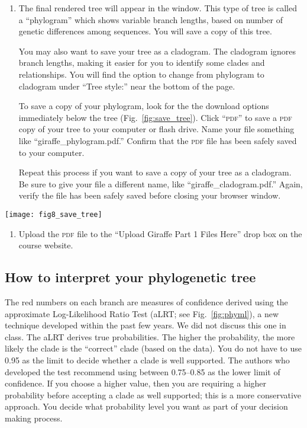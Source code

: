 \documentclass[11pt, addpoints]{exam}
\begin{document}
\begin{enumerate}
\item
  The final rendered tree will appear in the window. This type of tree is called
  a “phylogram” which shows variable branch lengths, based on number of 
  genetic differences among sequences. You will save a copy of this tree.
  
  You may also want to save your tree as a cladogram. The cladogram ignores
  branch lengths, making it easier for you to identify some clades and relationships.
  You will find the option to change from phylogram to cladogram under “Tree style:”
  near the bottom of the page.
  
  To save a copy of your phylogram, look for the the download options immediately 
  below the tree (Fig.~\ref{fig:save_tree}). Click “\textsc{pdf}” to
  save a \textsc{pdf} copy of your tree to your computer or flash drive. Name your file something
  like “giraffe\_phylogram.pdf.” Confirm that the \textsc{pdf} file has been safely saved to your 
  computer.
  
  Repeat this process if you want to save a copy of your tree as a cladogram. Be sure to
  give your file a different name, like “giraffe\_cladogram.pdf.” Again, verify the file has
  been safely saved before closing your browser window.
  
\end{enumerate}

\begin{center}
	\texttt{[image: fig8\_save\_tree]}
\end{center}

\begin{enumerate}
\item
  Upload the \textsc{pdf} file to the ``Upload Giraffe Part 1 Files Here'' drop
  box on the course website.
\end{enumerate}

\subsection*{How to interpret your phylogenetic tree}

The red numbers on each branch are measures of confidence derived using
the approximate Log-Likelihood Ratio Test (aLRT; see Fig.~\ref{fig:phyml}), a new
technique developed within the past few years. We did not discuss this
one in class. The aLRT derives true probabilities. The higher the
probability, the more likely the clade is the “correct” clade (based
on the data). You do not have to use 0.95 as the limit to decide whether
a clade is well supported. The authors who developed the test recommend
using between 0.75--0.85 as the lower limit of confidence. If you choose
a higher value, then you are requiring a higher probability before
accepting a clade as well supported; this is a more conservative
approach. You decide what probability level you want as part of your
decision making process.
\end{document}

